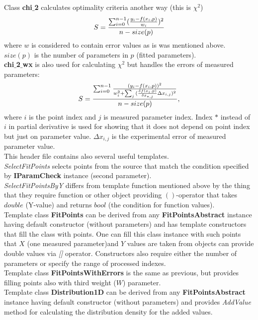 \documentclass[a4paper]{article}
\begin{document}
Class \textbf{chi$\_$2} calculates optimality criteria another way (this is $\chi^2$)
\begin{equation}\Large
S = \frac{\sum_{i=0}^{n-1}(\frac{y_i-f(x_i,p)}{w_i})^2}{n - size(p)}
\label{chi_2}
\end{equation}
where $w$ is considered to contain error values as is was mentioned above. $size(p)$ is the number of parameters in $p$ (fitted parameters).
\\
\textbf{chi$\_$2$\_$wx} is also used for calculating $\chi^2$ but handles the errors of measured parameters:
\begin{equation}\Large
S = \frac{\sum_{i=0}^{n-1}\frac{(y_i-f(x_i,p))^2}{w_i^2+\sum_j{(\frac{\delta f(x_i,p)}{\delta x_{*,j}}\Delta x_{i,j})^2}}}{n - size(p)},
\label{chi_2_ex}
\end{equation}
where $i$ is the point index and $j$ is measured parameter index.
Index $*$ instead of $i$ in partial derivative is used for showing that it does not depend on point index but just on parameter value.
$\Delta x_{i,j}$ is the experimental error of measured parameter value.\\
This header file contains also several useful templates.\\
\textit{SelectFitPoints} selects points from the source that match the condition specified by \textbf{IParamCheck} instance (second parameter).
\\
\textit{SelectFitPointsByY} differs from template function mentioned above by the thing that they require function or other object providing $()$-operator that takes $double$ (Y-value) and returns $bool$ (the condition for function values).
\\
Template class \textbf{FitPoints} can be derived from any \textbf{FitPointsAbstract} instance having default constructor (without parameters) and has template constructors that fill the class with points. 
One can fill this class instance with such points that $X$ (one measured parameter)and $Y$ values are taken from objects can provide double values via \textit{[]} operator.
Constructors also require either the number of parameters or specify the range of processed indexes.
\\
Template class \textbf{FitPointsWithErrors} is the same as previous, but provides filling points also with third weight ($W$) parameter.
\\
Template class \textbf{Distribution1D} can be derived from any \textbf{FitPointsAbstract} instance having default constructor (without parameters) and provides \textit{AddValue} method for calculating the distribution density for the added values.
\end{document}
